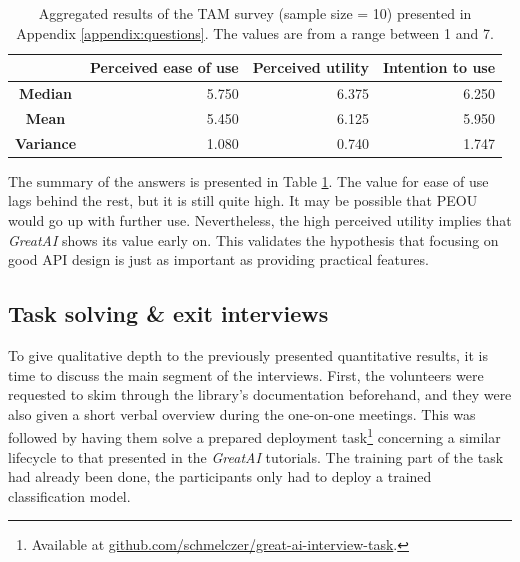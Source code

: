 \begin{table}[H]
\centering
\captionsetup{width=.9\linewidth}
\caption{Aggregated results of the TAM survey (sample size = 10) presented in Appendix \ref{appendix:questions}. The values are from a range between 1 and 7.}
\label{table:tam}
{\renewcommand{\arraystretch}{1.2} %
\begin{tabular}{|c|r|r|r|} \hline
                    & \textbf{Perceived ease of use} & \textbf{Perceived utility} & \textbf{Intention to use} \\\hline
\textbf{Median}     & 5.750                          & 6.375                      & 6.250                     \\\hline
\textbf{Mean}       & 5.450                          & 6.125                      & 5.950                     \\\hline
\textbf{Variance}   & 1.080                          & 0.740                      & 1.747                     \\\hline
\end{tabular}}
\end{table}

The summary of the answers is presented in Table \ref{table:tam}. The value for ease of use lags behind the rest, but it is still quite high. It may be possible that PEOU would go up with further use. Nevertheless, the high perceived utility implies that \textit{GreatAI} shows its value early on. This validates the hypothesis that focusing on good API design is just as important as providing practical features.

\subsection{Task solving \& exit interviews}

To give qualitative depth to the previously presented quantitative results, it is time to discuss the main segment of the interviews. First, the volunteers were requested to skim through the library's documentation beforehand, and they were also given a short verbal overview during the one-on-one meetings. This was followed by having them solve a prepared deployment task\footnote{Available at \href{https://github.com/schmelczer/great-ai-interview-task}{github.com/schmelczer/great-ai-interview-task}.} concerning a similar lifecycle to that presented in the \textit{GreatAI} tutorials. The training part of the task had already been done, the participants only had to deploy a trained classification model.

